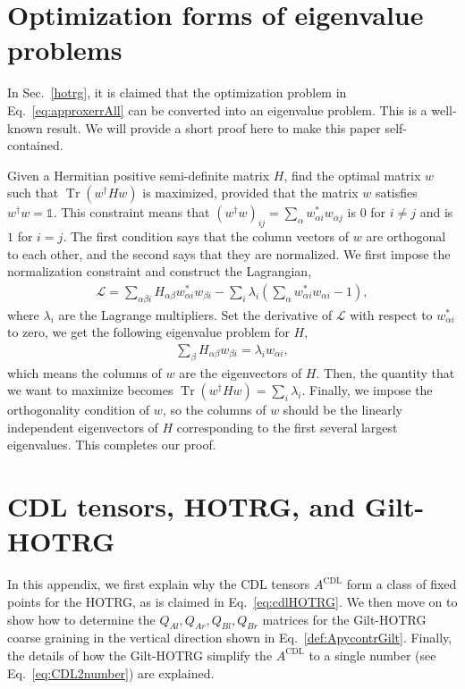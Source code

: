 \documentclass[aps,prb,reprint,superscriptaddress]{revtex4-2}
\DeclareMathOperator{\Tr}{Tr}
\begin{document}
\appendix
\section{Optimization forms of eigenvalue problems\label{appd:opteig}}
In Sec.~\ref{hotrg}, it is claimed that the optimization problem in
Eq.~\eqref{eq:approxerrAll} can be converted into an eigenvalue problem.
This is a well-known result. We will provide a short proof here to make
this paper self-contained. 
%

Given a Hermitian positive semi-definite matrix $H$, find the optimal
matrix $w$ such that $\Tr{(w^{\dagger} H w)}$ is maximized, provided that
the matrix $w$ satisfies $w^{\dagger}w = \mathbb{1}$. This constraint
means that $(w^{\dagger}w)_{ij} = \sum_{\alpha} w^*_{\alpha i} w_{\alpha
j}$ is $0$ for $i\neq j$ and is $1$ for $i = j$. The first condition
says that the column vectors of $w$ are orthogonal to each other, and the
second says that they are normalized. We first impose the normalization
constraint and construct the Lagrangian,
%
\begin{align}\label{eq:langMult}
    \mathcal{L} = \sum_{\alpha \beta i} H_{\alpha\beta} w^*_{\alpha i}
    w_{\beta i} - \sum_i \lambda _i \left(\sum_{\alpha}w^*_{\alpha i}
        w_{\alpha i} - 1\right),
\end{align}
%
where $\lambda_i$ are the Lagrange multipliers. Set the derivative of
$\mathcal{L}$ with respect to $w^*_{\alpha i}$ to zero, we get the
following eigenvalue problem for $H$,
%
\begin{align}\label{eq:eigenProblem}
    \sum_{\beta} H_{\alpha\beta} w_{\beta i} = \lambda_i w_{\alpha i},
\end{align}
%
which means the columns of $w$ are the eigenvectors of $H$. Then, the
quantity that we want to maximize becomes $\Tr{(w^{\dagger}Hw)} = \sum_i
\lambda_i$. Finally, we impose the orthogonality condition of $w$, so
the columns of $w$ should be the linearly independent eigenvectors of
$H$ corresponding to the first several largest eigenvalues. This
completes our proof.
%

\section{CDL tensors, HOTRG, and Gilt-HOTRG\label{appd:cdlHOTRG}}
In this appendix, we first explain why the CDL tensors $A^{\text{CDL}}$
form a class of fixed points for the HOTRG, as is claimed in
Eq.~\eqref{eq:cdlHOTRG}. We then move on to show how to determine the
$Q_{Al},Q_{Ar},Q_{Bl}, Q_{Br}$ matrices for the Gilt-HOTRG coarse
graining in the vertical direction shown in
Eq.~\eqref{def:ApycontrGilt}. Finally, the details of how the Gilt-HOTRG
simplify the $A^{\text{CDL}}$ to a single number (see
Eq.~\eqref{eq:CDL2number}) are explained.
%
\end{document}
